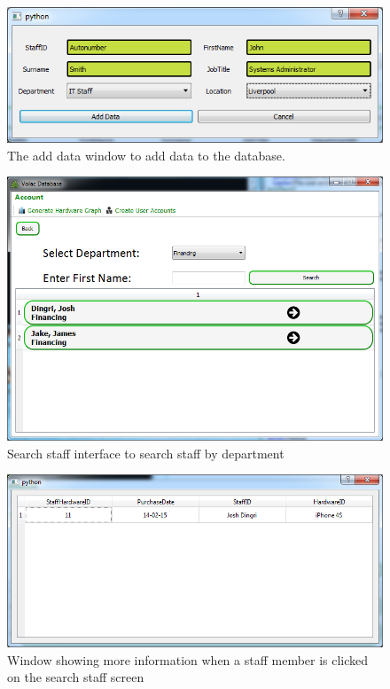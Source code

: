 \begin{figure}[H]
    \includegraphics[width=\textwidth]{./Maintenance/Images/AddingData.png}
    \caption{The add data window to add data to the database.} \label{fig:AddingData}
\end{figure}

\begin{figure}[H]
    \includegraphics[width=\textwidth]{./Maintenance/Images/searchstaff.png}
    \caption{Search staff interface to search staff by department} \label{fig:searchstaff}
\end{figure}

\begin{figure}[H]
    \includegraphics[width=\textwidth]{./Maintenance/Images/searchstaffresult.png}
    \caption{Window showing more information when a staff member is clicked on the search staff screen} \label{fig:searchstaffresult}
\end{figure}

